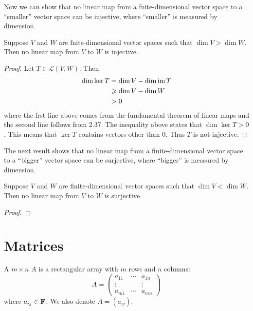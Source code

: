 Now we can show that no linear map from a fnite-dimensional vector space to a ``smaller'' vector space can be injective, where ``smaller'' is measured by dimension.

\begin{proposition}
Suppose $V$ and $W$ are fnite-dimensional vector spaces such that $\dim V>\dim W$. Then no linear map from $V$ to $W$ is injective.
\end{proposition}

\begin{proof}
Let $T\in\mathcal{L}(V,W)$. Then
\begin{align*}
\dim\ker T
&=\dim V-\dim\operatorname{im} T\\
&\geqslant\dim V-\dim W\\
&>0
\end{align*}
where the frst line above comes from the fundamental theorem of linear maps and the second line follows from 2.37. The inequality above states that $\dim\ker T>0$. This means that $\ker T$ contains vectors other than $0$. Thus $T$ is not injective.
\end{proof}

The next result shows that no linear map from a finite-dimensional vector space to a ``bigger'' vector space can be surjective, where ``bigger'' is measured by dimension.

\begin{proposition}
Suppose $V$ and $W$ are finite-dimensional vector spaces such that $\dim V<\dim W$. Then no linear map from $V$ to $W$ is surjective.
\end{proposition}

\begin{proof}

\end{proof}

\section{Matrices}
\begin{definition}[Matrix]
A $m\times n$  $A$ is a rectangular array with $m$ rows and $n$ columns:
\[A=\begin{pmatrix}
a_{11} & \cdots & a_{1n}\\
\vdots & & \vdots\\
a_{m1} & \cdots & a_{mn}
\end{pmatrix}\]
where $a_{ij}\in\mathbf F$. We also denote $A=(a_{ij})$.
\end{definition}

